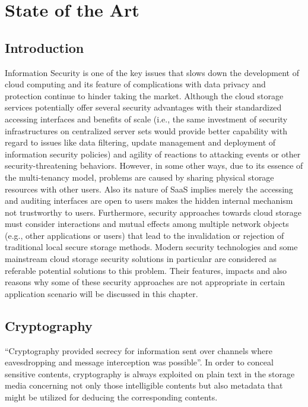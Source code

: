 \chapter{State of the Art}

\section{Introduction}

Information Security is one of the key issues that slows down the development of cloud computing and its feature of complications with data privacy and protection continue to hinder taking the market\cite{Subashini2011}. Although the cloud storage services potentially offer several security advantages with their standardized accessing interfaces and benefits of scale (i.e., the same investment of security infrastructures on centralized server sets would provide better capability with regard to issues like data filtering, update management and deployment of information security policies) and agility of reactions to attacking events or other security-threatening behaviors. However, in some other ways, due to its essence of the multi-tenancy model\cite{Dillon2010}, problems are caused by sharing physical storage resources with other users. Also its nature of SaaS implies merely the accessing and auditing interfaces are open to users makes the hidden internal mechanism not trustworthy to users. Furthermore, security approaches towards cloud storage must consider interactions and mutual effects among multiple network objects (e.g., other applications or users)\cite{Ou2005} that lead to the invalidation or rejection of traditional local secure storage methods. Modern security technologies and some mainstream cloud storage security solutions in particular are considered as referable potential solutions to this problem. Their features, impacts and also reasons why some of these security approaches are not appropriate in certain application scenario will be discussed in this chapter.

\section{Cryptography}

“Cryptography provided secrecy for information sent over channels where eavesdropping and message interception was possible”\cite{Rob1982}. In order to conceal sensitive contents, cryptography is always exploited on plain text in the storage media concerning not only those intelligible contents but also metadata that might be utilized for deducing the corresponding contents.

